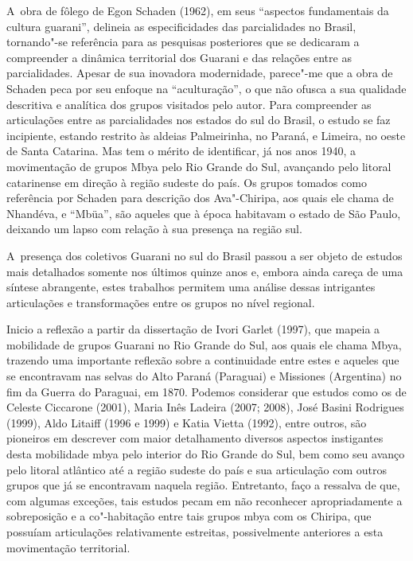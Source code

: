 A~obra de fôlego de Egon Schaden (1962), em seus ``aspectos fundamentais
da cultura guarani'', delineia as especificidades das parcialidades no
Brasil, tornando"-se referência para as pesquisas posteriores que se
dedicaram a compreender a dinâmica territorial dos Guarani e das
relações entre as parcialidades. Apesar de sua inovadora modernidade,
parece"-me que a obra de Schaden peca por seu enfoque na ``aculturação'',
o que não ofusca a sua qualidade descritiva e analítica dos grupos
visitados pelo autor. Para compreender as articulações entre as
parcialidades nos estados do sul do Brasil, o estudo se faz incipiente,
estando restrito às aldeias Palmeirinha, no Paraná, e Limeira, no oeste
de Santa Catarina. Mas tem o mérito de identificar, já nos anos 1940, a
movimentação de grupos Mbya pelo Rio Grande do Sul, avançando pelo
litoral catarinense em direção à região sudeste do país. Os grupos
tomados como referência por Schaden para descrição dos Ava"-Chiripa, aos
quais ele chama de Nhandéva, e ``Mbüa'', são aqueles que à época
habitavam o estado de São Paulo, deixando um lapso com relação à sua
presença na região sul.

A~presença dos coletivos Guarani no sul do Brasil passou a ser objeto de
estudos mais detalhados somente nos últimos quinze anos e, embora ainda
careça de uma síntese abrangente, estes trabalhos permitem uma análise
dessas intrigantes articulações e transformações entre os grupos no
nível regional. 

Inicio a reflexão a partir da dissertação de Ivori Garlet (1997), que
mapeia a mobilidade de grupos Guarani no Rio Grande do Sul, aos quais
ele chama Mbya, trazendo uma importante reflexão sobre a continuidade
entre estes e aqueles que se encontravam nas selvas do Alto Paraná
(Paraguai) e Missiones (Argentina) no fim da Guerra do Paraguai, em
1870. Podemos considerar que estudos como os de Celeste Ciccarone
(2001), Maria Inês Ladeira (2007; 2008), José Basini Rodrigues (1999),
Aldo Litaiff (1996 e 1999) e Katia Vietta (1992), entre outros, são
pioneiros em descrever com maior detalhamento diversos aspectos
instigantes desta mobilidade mbya pelo interior do Rio Grande do Sul,
bem como seu avanço pelo litoral atlântico até a região sudeste do país
e sua articulação com outros grupos que já se encontravam naquela
região. Entretanto, faço a ressalva de que, com algumas exceções, tais
estudos pecam em não reconhecer apropriadamente a sobreposição e a
co"-habitação entre tais grupos mbya com os Chiripa, que possuíam
articulações relativamente estreitas, possivelmente anteriores a esta
movimentação territorial.

